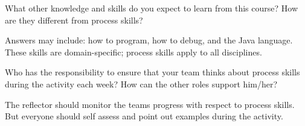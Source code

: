 \Q What other knowledge and skills do you expect to learn from this course?
How are they different from process skills?

\begin{answer}
Answers may include: how to program, how to debug, and the Java language.
These skills are domain-specific; process skills apply to all disciplines.
\end{answer}


\Q Who has the responsibility to ensure that your team thinks about process skills during the activity each week?
How can the other roles support him/her?

\begin{answer}
The reflector should monitor the teams progress with respect to process skills.
But everyone should self assess and point out examples during the activity.
\end{answer}
